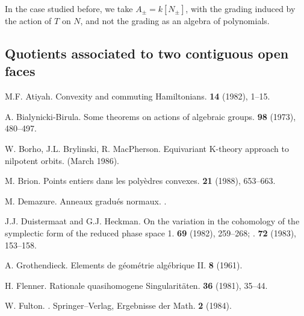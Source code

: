 \documentclass{article}
\begin{document}
In the case studied before, we take $A_\pm=k[N_\pm]$, with the grading induced by the action of $T$ on $N$, and not the grading as an algebra of polynomials.


\subsection{Quotients associated to two contiguous open faces}
\label{2.3}





\nocite{*}

\begin{thebibliography}{25}

  {M.F. Atiyah.}
  \newblock Convexity and commuting Hamiltonians.
   \textbf{14} (1982), 1--15.

  {A. Bialynicki-Birula.}
  \newblock Some theorems on actions of algebraic groups.
   \textbf{98} (1973), 480--497.

  {W. Borho, J.L. Brylinski, R. MacPherson.}
  \newblock Equivariant K-theory approach to nilpotent orbits.
   (March 1986).

  {M. Brion.}
  \newblock Points entiers dans les poly\`{e}dres convexes.
   \textbf{21} (1988), 653--663.

  {M. Demazure.}
  \newblock Anneaux gradu\'{e}s normaux.
  .

  {J.J. Duistermaat and G.J. Heckman.}
  \newblock On the variation in the cohomology of the symplectic form of the reduced phase space 1.
   \textbf{69} (1982), 259--268;
  .
   \textbf{72} (1983), 153--158.

  {A. Grothendieck.}
  \newblock Elements de g\'{e}om\'{e}trie alg\'{e}brique II.
   \textbf{8} (1961).

  {H. Flenner.}
  \newblock Rationale quasihomogene Singularit\"{a}ten.
   \textbf{36} (1981), 35--44.

  {W. Fulton.}
  .
  \newblock Springer--Verlag, {Ergebnisse der Math.} \textbf{2} (1984).


\end{thebibliography}
\end{document}
